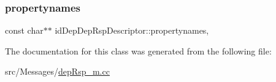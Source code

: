 \subsubsection{\texorpdfstring{propertynames}{propertynames}}
{\footnotesize\ttfamily const char$\ast$$\ast$ id\+Dep\+Dep\+Rsp\+Descriptor\+::propertynames\hspace{0.3cm}{\ttfamily [mutable]}, {\ttfamily [private]}}



The documentation for this class was generated from the following file\+:\begin{DoxyCompactItemize}
\item 
src/\+Messages/\hyperlink{dep_rsp__m_8cc}{dep\+Rsp\+\_\+m.\+cc}\end{DoxyCompactItemize}
